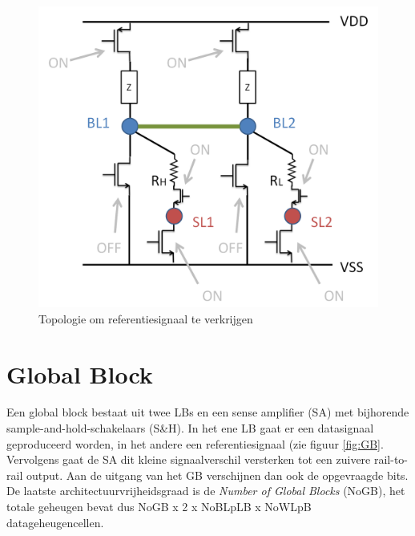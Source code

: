 \begin{figure}
  \centering
  \includegraphics[scale=0.3]{../fig/hfdstk-architecture-ref2cell.png}
  \caption{Topologie om referentiesignaal te verkrijgen}
  \label{fig:2cellref}
\end{figure}

\section{Global Block}
\label{globalblock}
Een global block bestaat uit twee LBs en een sense amplifier (SA) met bijhorende sample-and-hold-schakelaars (S\&H). In het ene LB gaat er een datasignaal geproduceerd worden, in het andere een referentiesignaal (zie figuur \ref{fig:GB}. Vervolgens gaat de SA dit kleine signaalverschil versterken tot een zuivere rail-to-rail output.
Aan de uitgang van het GB verschijnen dan ook de opgevraagde bits.
De laatste architectuurvrijheidsgraad is de \emph{Number of Global Blocks} (NoGB), het totale geheugen bevat dus NoGB x 2 x NoBLpLB x NoWLpB datageheugencellen.

